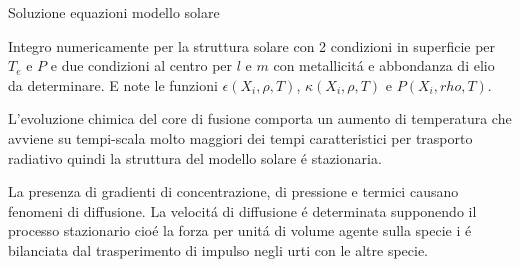 \documentclass[10pt,xcolor={usenames},fleqn,mathserif,serif]{beamer}
\begin{document}
\begin{wordonframe}{Soluzione equazioni modello solare}

Integro numericamente per la struttura solare con 2 condizioni in superficie per $T_e$ e $P$ e due condizioni al centro per $l$ e $m$ con metallicit\'a e abbondanza di elio da determinare. E note le funzioni $\epsilon(X_i,\rho,T)$, $\kappa(X_i,\rho,T)$ e $P(X_i,rho,T)$.

L'evoluzione chimica del core di fusione comporta un aumento di temperatura che avviene su tempi-scala molto maggiori dei tempi caratteristici per trasporto radiativo quindi la struttura del modello solare \'e stazionaria.

La presenza di gradienti di concentrazione, di pressione e termici causano fenomeni di diffusione. La velocit\'a di diffusione \'e determinata supponendo il processo stazionario cio\'e la forza per unit\'a di volume agente sulla specie i \'e bilanciata dal trasperimento di impulso negli urti con le altre specie.

\end{wordonframe}
\end{document}

